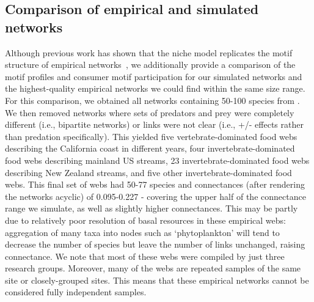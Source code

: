\documentclass[12pt]{article}
\begin{document}
\begin{spacing}{2.0}
    \subsection*{Comparison of empirical and simulated networks}
    
    
        Although previous work has shown that the niche model replicates the motif structure of empirical networks~\citep{Stouffer2005a,Stouffer2006}, we additionally provide a comparison of the motif profiles and consumer motif participation for our simulated networks and the highest-quality empirical networks we could find within the same size range.
        For this comparison, we obtained all networks containing 50-100 species from \citet{globalwebdb}.
        We then removed networks where sets of predators and prey were completely different (i.e., bipartite networks) or links were not clear (i.e., +/- effects rather than predation specifically).
        This yielded five vertebrate-dominated food webs describing the California coast in different years, four invertebrate-dominated food webs describing mainland US streams, 23 invertebrate-dominated food webs describing New Zealand streams, and five other invertebrate-dominated food webs.
        This final set of webs had 50-77 species and connectances (after rendering the networks acyclic) of 0.095-0.227 - covering the upper half of the connectance range we simulate, as well as slightly higher connectances.
        This may be partly due to relatively poor resolution of basal resources in these empirical webs: aggregation of many taxa into nodes such as `phytoplankton' will tend to decrease the number of species but leave the number of links unchanged, raising connectance.
        We note that most of these webs were compiled by just three research groups.
        Moreover, many of the webs are repeated samples of the same site  or closely-grouped sites.
        This means that these empirical networks cannot be considered fully independent samples.
        

\end{spacing}
\end{document}
